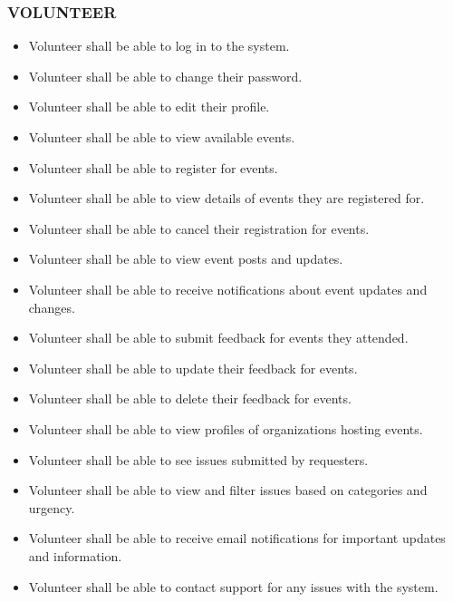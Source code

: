 \subsubsection*{VOLUNTEER}
\begin{itemize}
\itemsep0em 
    \item Volunteer shall be able to log in to the system.
    \item Volunteer shall be able to change their password.
    \item Volunteer shall be able to edit their profile.
    \item Volunteer shall be able to view available events.
    \item Volunteer shall be able to register for events.
    \item Volunteer shall be able to view details of events they are registered for.
    \item Volunteer shall be able to cancel their registration for events.
    \item Volunteer shall be able to view event posts and updates.
    \item Volunteer shall be able to receive notifications about event updates and changes.
    \item Volunteer shall be able to submit feedback for events they attended.
    \item Volunteer shall be able to update their feedback for events.
    \item Volunteer shall be able to delete their feedback for events.
    \item Volunteer shall be able to view profiles of organizations hosting events.
    \item Volunteer shall be able to see issues submitted by requesters.
    \item Volunteer shall be able to view and filter issues based on categories and urgency.
    \item Volunteer shall be able to receive email notifications for important updates and information.
    \item Volunteer shall be able to contact support for any issues with the system.
\end{itemize}

